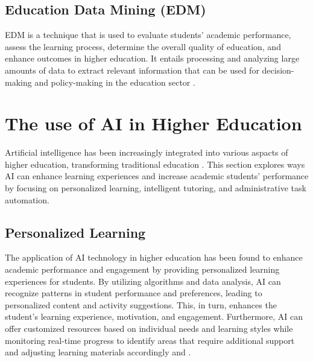 \subsection{Education Data Mining (EDM)}
EDM is a technique that is used to evaluate students' academic performance,
assess the learning process, determine the overall quality of education, and enhance outcomes in higher education.
It entails processing and analyzing large amounts of data to extract relevant information that can be used for
decision-making and policy-making in the education sector \citep{arifin_using_2022}.


\section{The use of AI in Higher Education }\label{use-ai}
\justifying
Artificial intelligence has been increasingly integrated into various aspacts of higher
education, transforming traditional education \citep{wang_exploring_2023}.  This section explores ways
AI can enhance learning experiences and increase academic students' performance by focusing on
personalized learning, intelligent tutoring, and administrative task automation.
\subsection{Personalized Learning}
The application of AI technology in higher education has been found to enhance academic performance
and engagement by providing personalized learning experiences for students. By utilizing algorithms
and data analysis, AI can recognize patterns in student performance and preferences, leading to personalized
content and activity suggestions. This, in turn, enhances the student’s learning experience, motivation, and
engagement. Furthermore, AI can offer customized resources based on individual needs and learning styles while
monitoring real-time progress to identify areas that require additional support and adjusting learning materials
accordingly \citep{guerrero-quinonez_artificial_2023} and \citep{l_d_of_cs_akshara_first_grade_college_2023}.



